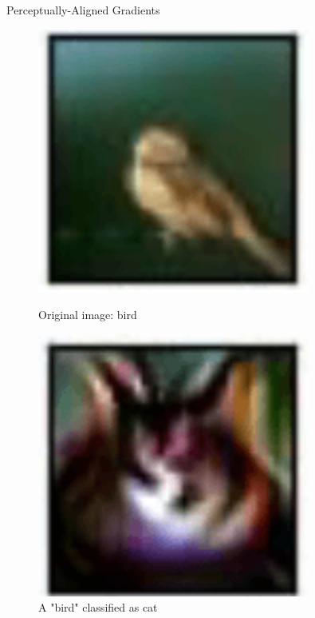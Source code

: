 \begin{frame}{Perceptually-Aligned Gradients}
    \begin{figure}
        \begin{minipage}{0.25\textwidth}
            \centering
            \includegraphics[width=0.8\textwidth]{assets/pag_original_bird.png}
            \caption{Original image: bird}
        \end{minipage}\hfill
        \begin{minipage}{0.25\textwidth}
            \centering
            \includegraphics[width=0.8\textwidth]{assets/pag_attack_cat.png}
            \caption{A "bird" classified as cat}
        \end{minipage}\hfill
        \begin{minipage}{0.25\textwidth}

\end{minipage}
\end{figure}
\end{frame}
